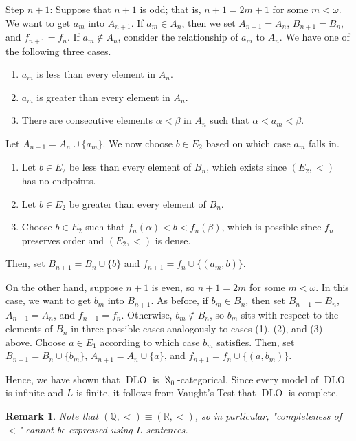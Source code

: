 \documentclass[10pt]{article}
\makeatletter
\newcommand{\R}{\mathbb{R}}
\newcommand{\Q}{\mathbb{Q}}
\DeclareMathOperator{\DLO}{DLO}
\theoremstyle{newstyle}
\newtheorem{remark}[thm]{Remark}
\newenvironment{pf}[1][\proofname]{\par
  \pushQED{\qed}%
  \normalfont \topsep0\p@\relax
  \trivlist
  \item[\hskip\labelsep\scshape
  #1\@addpunct{.}]\ignorespaces
}{%
  \popQED\endtrivlist\@endpefalse
}
\makeatother
\begin{document}
\begin{pf}
\underline{Step $n+1$:} Suppose that $n + 1$ is odd; that is, $n + 1 = 2m + 1$ for some $m < \omega$. 
We want to get $a_m$ into $A_{n+1}$. If $a_m \in A_n$, then we set $A_{n+1} = A_n$, 
$B_{n+1} = B_n$, and $f_{n+1} = f_n$. If $a_m \notin A_n$, consider the relationship of $a_m$ 
to $A_n$. We have one of the following three cases.
\begin{enumerate}[(1)]
    \item $a_m$ is less than every element in $A_n$.
    \item $a_m$ is greater than every element in $A_n$.
    \item There are consecutive elements $\alpha < \beta$ in $A_n$ such that $\alpha < a_m < \beta$.
\end{enumerate}
Let $A_{n+1} = A_n \cup \{a_m\}$. We now choose $b \in E_2$ based on which case $a_m$ falls in.
\begin{enumerate}[(1)]
    \item Let $b \in E_2$ be less than every element of $B_n$, which exists since $(E_2, <)$ 
    has no endpoints. 
    \item Let $b \in E_2$ be greater than every element of $B_n$.
    \item Choose $b \in E_2$ such that $f_n(\alpha) < b < f_n(\beta)$, which is possible 
    since $f_n$ preserves order and $(E_2, <)$ is dense.
\end{enumerate}
Then, set $B_{n+1} = B_n \cup \{b\}$ and $f_{n+1} = f_n \cup \{(a_m, b)\}$. 

On the other hand, suppose $n + 1$ is even, so $n + 1 = 2m$ for some $m < \omega$. 
In this case, we want to get $b_m$ into $B_{n+1}$. As before, if 
$b_m \in B_n$, then set $B_{n+1} = B_n$, $A_{n+1} = A_n$, and $f_{n+1} = f_n$. 
Otherwise, $b_m \notin B_n$, so $b_m$ sits with respect to the elements of $B_n$ in three 
possible cases analogously to cases (1), (2), and (3) above. Choose $a \in E_1$ according to 
which case $b_m$ satisfies. Then, set $B_{n+1} = B_n \cup \{b_m\}$, 
$A_{n+1} = A_n \cup \{a\}$, and $f_{n+1} = f_n \cup \{(a, b_m)\}$. 

Hence, we have shown that $\DLO$ is $\aleph_0$-categorical. Since every model of $\DLO$ is infinite 
and $L$ is finite, it follows from Vaught's Test that $\DLO$ is complete. 
\end{pf}

\begin{remark}
Note that $(\Q, <) \equiv (\R, <)$, so in particular, "completeness of $<$" cannot be expressed 
using $L$-sentences. 
\end{remark}
\end{document}

